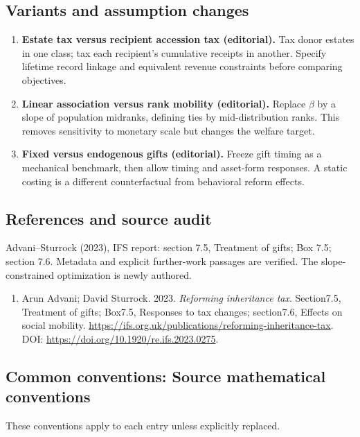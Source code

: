\documentclass[11pt,a4paper]{article}
\begin{document}
\subsection*{Variants and assumption changes}
\begin{enumerate}
\item \textbf{Estate tax versus recipient accession tax (editorial).} Tax donor estates in one class; tax each recipient's cumulative receipts in another. Specify lifetime record linkage and equivalent revenue constraints before comparing objectives.
\item \textbf{Linear association versus rank mobility (editorial).} Replace \(\beta\) by a slope of population midranks, defining ties by mid-distribution ranks. This removes sensitivity to monetary scale but changes the welfare target.
\item \textbf{Fixed versus endogenous gifts (editorial).} Freeze gift timing as a mechanical benchmark, then allow timing and asset-form responses. A static costing is a different counterfactual from behavioral reform effects.
\end{enumerate}
\subsection*{References and source audit}
Advani--Sturrock (2023), IFS report: section 7.5, Treatment of gifts; Box 7.5; section 7.6. Metadata and explicit further-work passages are verified. The slope-constrained optimization is newly authored.
\begin{enumerate}\raggedright
\item\hypertarget{definitions:source:30007755:1}{} Arun Advani; David Sturrock. 2023. \emph{Reforming inheritance tax}. Section7.5, Treatment of gifts; Box7.5, Responses to tax changes; section7.6, Effects on social mobility.
\url{https://ifs.org.uk/publications/reforming-inheritance-tax}.
DOI: \url{https://doi.org/10.1920/re.ifs.2023.0275}.
\end{enumerate}

\subsection*{Common conventions: Source mathematical conventions}

These conventions apply to each entry unless explicitly replaced.
\end{document}
